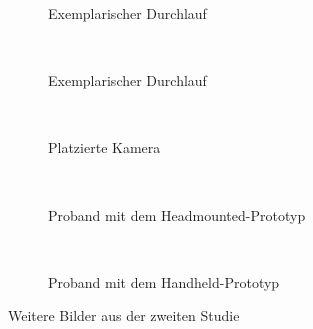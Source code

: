 \begin{figure}[H]
	\centering
	\begin{subfigure}[t]{0.3\textwidth}
		\centering
		\caption{Exemplarischer Durchlauf}
		\label{fig:study2_run1}
	\end{subfigure}
	~
	\begin{subfigure}[t]{0.3\textwidth}
		\centering
		\caption{Exemplarischer Durchlauf}
		\label{fig:study2_run2}
	\end{subfigure}
	~
	\begin{subfigure}[t]{0.3\textwidth}
		\centering
		\caption{Platzierte Kamera}
		\label{fig:study2_cam}
	\end{subfigure}
	~
	\begin{subfigure}[t]{0.3\textwidth}
		\centering
		\caption{Proband mit dem Headmounted-Prototyp}
		\label{fig:study2_user_hdm}
	\end{subfigure}
	~
	\begin{subfigure}[t]{0.3\textwidth}
		\centering
		\caption{Proband mit dem Handheld-Prototyp}
		\label{fig:study2_user_hand}
	\end{subfigure}
	\caption{Weitere Bilder aus der zweiten Studie}
	\label{fig:study2_study}
\end{figure}